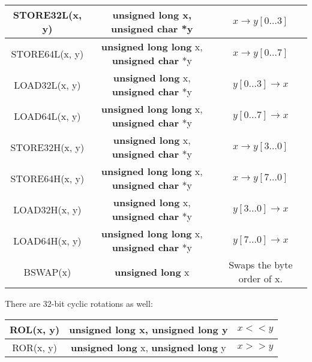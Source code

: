 \documentclass{book}
\begin{document}
   
    
\begin{small}
\begin{center}
\begin{tabular}{|c|c|c|}
     \hline STORE32L(x, y) & {\bf unsigned long} x, {\bf unsigned char} *y & $x \to y[0 \ldots 3]$ \\
     \hline STORE64L(x, y) & {\bf unsigned long long} x, {\bf unsigned char} *y & $x \to y[0 \ldots 7]$ \\
     \hline LOAD32L(x, y) & {\bf unsigned long} x, {\bf unsigned char} *y & $y[0 \ldots 3] \to x$ \\
     \hline LOAD64L(x, y) & {\bf unsigned long long} x, {\bf unsigned char} *y & $y[0 \ldots 7] \to x$ \\
     \hline STORE32H(x, y) & {\bf unsigned long} x, {\bf unsigned char} *y & $x \to y[3 \ldots 0]$ \\
     \hline STORE64H(x, y) & {\bf unsigned long long} x, {\bf unsigned char} *y & $x \to y[7 \ldots 0]$ \\
     \hline LOAD32H(x, y) & {\bf unsigned long} x, {\bf unsigned char} *y & $y[3 \ldots 0] \to x$ \\
     \hline LOAD64H(x, y) & {\bf unsigned long long} x, {\bf unsigned char} *y & $y[7 \ldots 0] \to x$ \\
     \hline BSWAP(x) & {\bf unsigned long} x & Swaps the byte order of x. \\
     \hline
\end{tabular}
\end{center}
\end{small}

There are 32-bit cyclic rotations as well:
 
\begin{center}
\begin{tabular}{|c|c|c|}
     \hline ROL(x, y) & {\bf unsigned long} x, {\bf unsigned long} y & $x << y$ \\
     \hline ROR(x, y) & {\bf unsigned long} x, {\bf unsigned long} y & $x >> y$ \\
     \hline
\end{tabular}
\end{center}
\end{document}
